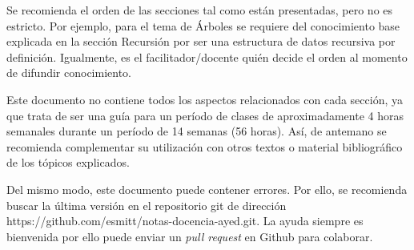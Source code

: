 Se recomienda el orden de las secciones tal como están presentadas, pero no es estricto. Por ejemplo, para el tema de Árboles se requiere del conocimiento base explicada en la sección Recursión por ser una estructura de datos recursiva por definición. Igualmente, es el facilitador/docente quién decide el orden al momento de difundir conocimiento.

Este documento no contiene todos los aspectos relacionados con cada sección, ya que trata de ser una guía para un período de clases de aproximadamente 4 horas semanales durante un período de 14 semanas (56 horas). Así, de antemano se recomienda complementar su utilización con otros textos o material bibliográfico de los tópicos explicados.

Del mismo modo, este documento puede contener errores. Por ello, se recomienda buscar la última versión en el repositorio git de dirección https://github.com/esmitt/notas-docencia-ayed.git. La ayuda siempre es bienvenida por ello puede enviar un \textit{pull request} en Github para colaborar.